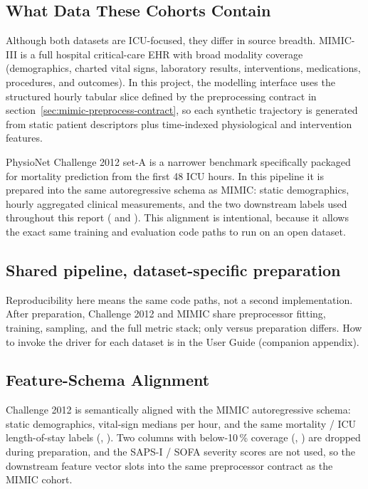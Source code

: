\subsection{What Data These Cohorts Contain}

Although both datasets are ICU-focused, they differ in source breadth. MIMIC-III is a full hospital critical-care EHR with broad modality coverage (demographics, charted vital signs, laboratory results, interventions, medications, procedures, and outcomes). In this project, the modelling interface uses the structured hourly tabular slice defined by the preprocessing contract in section~\ref{sec:mimic-preprocess-contract}, so each synthetic trajectory is generated from static patient descriptors plus time-indexed physiological and intervention features.

PhysioNet Challenge 2012 set-A is a narrower benchmark specifically packaged for mortality prediction from the first 48 ICU hours. In this pipeline it is prepared into the same autoregressive schema as MIMIC: static demographics, hourly aggregated clinical measurements, and the two downstream labels used throughout this report ( and ). This alignment is intentional, because it allows the exact same training and evaluation code paths to run on an open dataset.

\subsection{Shared pipeline, dataset-specific preparation}

Reproducibility here means the same code paths, not a second implementation. After preparation, Challenge 2012 and MIMIC share preprocessor fitting, training, sampling, and the full metric stack; only  versus  preparation differs. How to invoke the driver for each dataset is in the User Guide (companion appendix).

\subsection{Feature-Schema Alignment}

Challenge 2012 is semantically aligned with the MIMIC autoregressive schema: static demographics, vital-sign medians per hour, and the same mortality / ICU length-of-stay labels (, ). Two columns with below-10\,\% coverage (, ) are dropped during preparation, and the SAPS-I / SOFA severity scores are not used, so the downstream feature vector slots into the same preprocessor contract as the MIMIC cohort.

